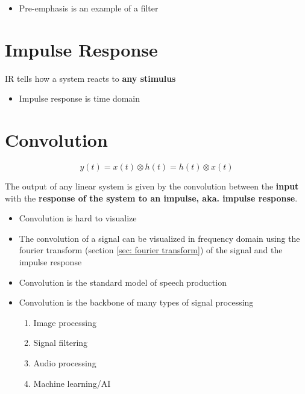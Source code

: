    \begin{itemize}
      \item Pre-emphasis is an example of a filter
    \end{itemize}

\section{Impulse Response}

  IR tells how a system reacts to \textbf{any stimulus}

  \begin{itemize}
    \item Impulse response is time domain
  \end{itemize}

\section{Convolution}

  \begin{equation}
    y\left( t \right)
      = x\left( t \right) \otimes h\left( t \right)
      = h\left( t \right) \otimes x\left( t \right)
  \end{equation}

  The output of any linear system is given by the convolution between
  the \textbf{input} with the \textbf{response of the system to an impulse,
  aka. impulse response}.

  \begin{itemize}
    \item Convolution is hard to visualize
    \item The convolution of a signal can be visualized in frequency domain
    using the fourier transform (section \ref{sec: fourier transform}) of the
    signal and the impulse response
    \item Convolution is the standard model of speech production
    \item Convolution is the backbone of many types of signal processing
    \begin{enumerate}
      \item Image processing
      \item Signal filtering
      \item Audio processing
      \item Machine learning/AI
    \end{enumerate}
  \end{itemize}

